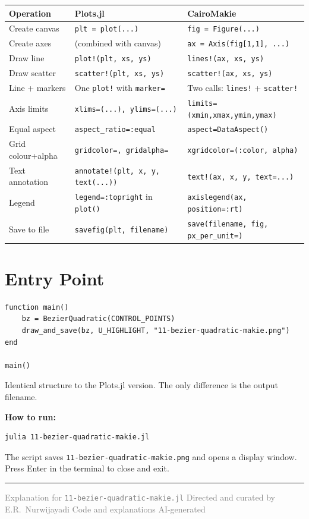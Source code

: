 \documentclass[12pt, a4paper]{article}
\newcommand{\cd}[1]{\texttt{#1}}
\begin{document}
\begin{center}
\begin{tabular}{p{3.8cm}p{4.8cm}p{4.8cm}}
\toprule
Operation & Plots.jl & CairoMakie \\
\midrule
Create canvas &
  \cd{plt = plot(...)} &
  \cd{fig = Figure(...)} \\[4pt]
Create axes &
  (combined with canvas) &
  \cd{ax = Axis(fig[1,1], ...)} \\[4pt]
Draw line &
  \cd{plot!(plt, xs, ys)} &
  \cd{lines!(ax, xs, ys)} \\[4pt]
Draw scatter &
  \cd{scatter!(plt, xs, ys)} &
  \cd{scatter!(ax, xs, ys)} \\[4pt]
Line + markers &
  One \cd{plot!} with \cd{marker=} &
  Two calls: \cd{lines!} + \cd{scatter!} \\[4pt]
Axis limits &
  \cd{xlims=(...), ylims=(...)} &
  \cd{limits=(xmin,xmax,ymin,ymax)} \\[4pt]
Equal aspect &
  \cd{aspect\_ratio=:equal} &
  \cd{aspect=DataAspect()} \\[4pt]
Grid colour+alpha &
  \cd{gridcolor=, gridalpha=} &
  \cd{xgridcolor=(:color, alpha)} \\[4pt]
Text annotation &
  \cd{annotate!(plt, x, y, text(...))} &
  \cd{text!(ax, x, y, text=...)} \\[4pt]
Legend &
  \cd{legend=:topright} in \cd{plot()} &
  \cd{axislegend(ax, position=:rt)} \\[4pt]
Save to file &
  \cd{savefig(plt, filename)} &
  \cd{save(filename, fig, px\_per\_unit=)} \\
\bottomrule
\end{tabular}
\end{center}


\section{Entry Point}

\begin{verbatim}
function main()
    bz = BezierQuadratic(CONTROL_POINTS)
    draw_and_save(bz, U_HIGHLIGHT, "11-bezier-quadratic-makie.png")
end

main()
\end{verbatim}

Identical structure to the Plots.jl version.
The only difference is the output filename.

\begin{notebox}
\textbf{How to run:}
\begin{verbatim}
julia 11-bezier-quadratic-makie.jl
\end{verbatim}
The script saves \cd{11-bezier-quadratic-makie.png}
and opens a display window.
Press Enter in the terminal to close and exit.
\end{notebox}

\vspace{2em}\hrule\vspace{0.5em}
{\small\textcolor{gray}{%
Explanation for \texttt{11-bezier-quadratic-makie.jl}
\textbar{} Directed and curated by E.R.\ Nurwijayadi
\textbar{} Code and explanations AI-generated}}
\end{document}
